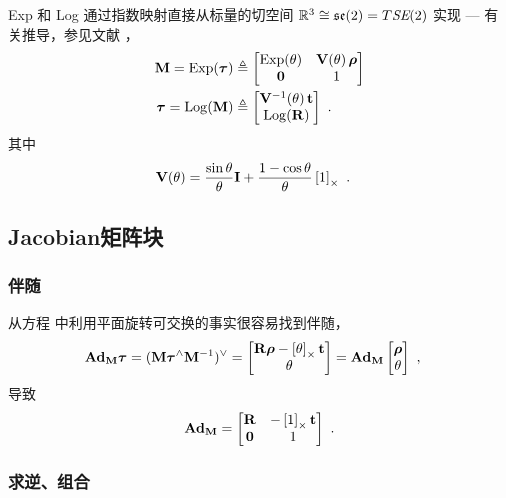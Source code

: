 Exp 和 Log 通过指数映射直接从标量的切空间 $\bbR^3\cong\se(2)=\mtan{\SE(2)}$ 实现 ---  有关推导，参见文献 \cite{EADE-Lie}，
%
\begin{align}
  \bfM = \Exp(\bftau) 
    &\te \begin{bmatrix}\Exp(\theta) & \bfV(\theta)\,\bfrho \\ \bf0 & 1  \end{bmatrix}  \label{equ:SE2_Exp} \\
  \bftau = \Log(\bfM) 
    &\te \begin{bmatrix} \bfV\inv(\theta)\, \bft \\ \Log(\bfR) \end{bmatrix}~.
\end{align}
%
其中
%
\begin{align}
  \bfV(\theta)
  &= 
  \frac{\sin\theta}{\theta}\bfI + \frac{1-\cos\theta}{\theta}\hatx{1}
  ~.
\end{align}

\subsection{Jacobian矩阵块}
\label{sec:derivatives_SE2}

\subsubsection{伴随}

从方程  中利用平面旋转可交换的事实很容易找到伴随，
%
\begin{align*}
\Ad[\SE(2)]{\bfM} \bftau &= (\bfM \bftau^\wedge \bfM\inv)^\vee 
= \begin{bmatrix}
\bfR\bfrho-\hatx{\theta}\bft \\ \theta
\end{bmatrix} = \Ad[\SE(2)]{\bfM} \begin{bmatrix}
\bfrho\\\theta
\end{bmatrix}
~,
\end{align*}
%
导致
%
\begin{align}
\Ad[\SE(2)]{\bfM} = \begin{bmatrix}
\bfR & -\hatx{1}\bft \\ \bf0 & 1
\end{bmatrix}
~.
\end{align}


\subsubsection{求逆、组合}

